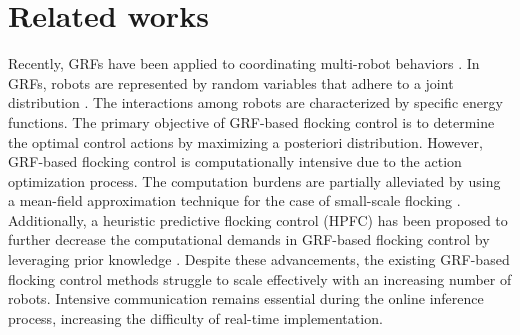 \section{Related works}
Recently, GRFs have been applied to coordinating multi-robot behaviors \cite{yu_grf-based_2024,rezeck_chemistry-inspired_2022,zhu_heuristic_2024}. In GRFs, robots are represented by random variables that adhere to a joint distribution \cite{guo_collision-free_2023}. The interactions among robots are characterized by specific energy functions. The primary objective of GRF-based flocking control is to determine the optimal control actions by maximizing a posteriori distribution.  However,  GRF-based flocking control is computationally intensive due to the action optimization process. The computation burdens are partially alleviated by using a mean-field approximation technique for the case of small-scale flocking  \cite{koller_probabilistic_2009, fernando_online_2021}.  {Additionally, a heuristic predictive flocking control (HPFC) has been proposed to further decrease the computational demands in GRF-based flocking control by leveraging prior knowledge \cite{zhu_heuristic_2024}}. 
Despite these advancements, the existing GRF-based flocking control methods struggle to scale effectively with an increasing number of robots. Intensive communication remains essential during the online inference process, increasing the difficulty of real-time implementation.


